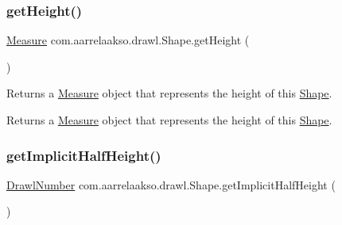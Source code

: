 \subsubsection{\texorpdfstring{get\+Height()}{getHeight()}}
{\footnotesize\ttfamily \hyperlink{classcom_1_1aarrelaakso_1_1drawl_1_1_measure}{Measure} com.\+aarrelaakso.\+drawl.\+Shape.\+get\+Height (\begin{DoxyParamCaption}{ }\end{DoxyParamCaption})}



Returns a \hyperlink{classcom_1_1aarrelaakso_1_1drawl_1_1_measure}{Measure} object that represents the height of this \hyperlink{classcom_1_1aarrelaakso_1_1drawl_1_1_shape}{Shape}. 

\begin{DoxyReturn}{Returns}
a \hyperlink{classcom_1_1aarrelaakso_1_1drawl_1_1_measure}{Measure} object that represents the height of this \hyperlink{classcom_1_1aarrelaakso_1_1drawl_1_1_shape}{Shape}. 
\end{DoxyReturn}
\mbox{\label{classcom_1_1aarrelaakso_1_1drawl_1_1_shape_aa476150489a3a5b634a15a1c03e045d7}} 
\subsubsection{\texorpdfstring{get\+Implicit\+Half\+Height()}{getImplicitHalfHeight()}}
{\footnotesize\ttfamily \hyperlink{classcom_1_1aarrelaakso_1_1drawl_1_1_drawl_number}{Drawl\+Number} com.\+aarrelaakso.\+drawl.\+Shape.\+get\+Implicit\+Half\+Height (\begin{DoxyParamCaption}{ }\end{DoxyParamCaption})\hspace{0.3cm}{\ttfamily [protected]}}

\mbox{\label{classcom_1_1aarrelaakso_1_1drawl_1_1_shape_ac796f934debb4cf92d285f387422deb6}} 
